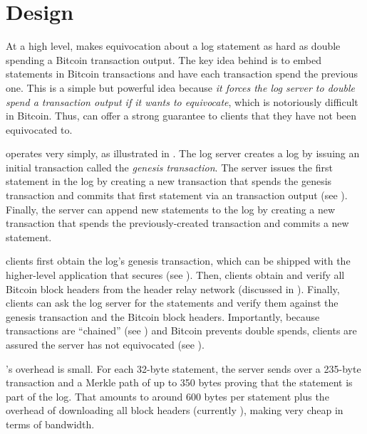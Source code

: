 \section{\Sys Design}
\label{sec:catena:design}

At a high level, \Sys makes equivocation about a log statement as hard as double spending a Bitcoin transaction output.
The key idea behind \Sys is to embed statements in Bitcoin transactions and have each transaction spend the previous one.
This is a simple but powerful idea because \emph{it forces the log server to double spend a transaction output if it wants to equivocate}, which is notoriously difficult in Bitcoin.
Thus, \Sys can offer a strong guarantee to clients that they have not been equivocated to.

\Sys operates very simply, as illustrated in .
The \Sys log server creates a log by issuing an initial transaction called the \emph{genesis transaction}.
The server issues the first statement in the log by creating a new transaction that spends the genesis transaction and commits that first statement via an \opret transaction output (see ).
Finally, the server can append new statements to the log by  creating a new transaction that spends the previously-created transaction and commits a new statement.

\Sys clients first obtain the log's genesis transaction, which can be shipped with the higher-level application that \Sys secures (see ).
Then, clients obtain and verify all Bitcoin block headers from the header relay network (discussed in ).
Finally, clients can ask the \Sys log server for the statements and verify them against the genesis transaction and the Bitcoin block headers.
Importantly, because \Sys transactions are ``chained'' (see ) and Bitcoin prevents double spends, clients are assured the server has not equivocated (see ).

\Sys's overhead is small.
For each 32-byte statement, the server sends over a 235-byte \Sys transaction and a Merkle path of up to 350 bytes proving that the statement is part of the log.
That amounts to around 600 bytes per statement plus the overhead of downloading all block headers (currently \headerssize), making \Sys very cheap in terms of bandwidth.

%


